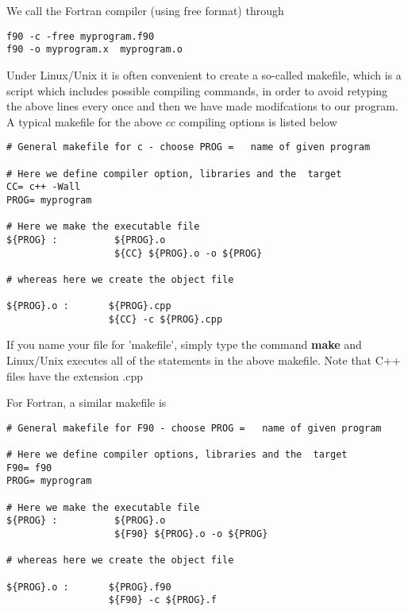 We call the Fortran compiler (using free format) through 
\begin{svgraybox}
\begin{verbatim}
f90 -c -free myprogram.f90
f90 -o myprogram.x  myprogram.o
\end{verbatim}
\end{svgraybox}
Under Linux/Unix it is often convenient to create a
so-called makefile, which is a script which includes possible
compiling commands, in order to avoid retyping the above lines
every once and then we have made modifcations to our program.
A typical makefile for the above $cc$ compiling options is listed
below
\begin{svgraybox}
\begin{verbatim}
# General makefile for c - choose PROG =   name of given program

# Here we define compiler option, libraries and the  target
CC= c++ -Wall
PROG= myprogram

# Here we make the executable file 
${PROG} :          ${PROG}.o
                   ${CC} ${PROG}.o -o ${PROG}

# whereas here we create the object file

${PROG}.o :       ${PROG}.cpp
                  ${CC} -c ${PROG}.cpp

\end{verbatim}   
\end{svgraybox}                                            
If you name your file for 'makefile', simply type the command
{\bf make} and Linux/Unix executes all of the statements in the above
makefile. Note that C++ files have the extension .cpp

For Fortran, a similar makefile is
\begin{svgraybox}
\begin{verbatim}
# General makefile for F90 - choose PROG =   name of given program

# Here we define compiler options, libraries and the  target
F90= f90 
PROG= myprogram

# Here we make the executable file 
${PROG} :          ${PROG}.o
                   ${F90} ${PROG}.o -o ${PROG}

# whereas here we create the object file

${PROG}.o :       ${PROG}.f90
                  ${F90} -c ${PROG}.f
\end{verbatim}                                               
\end{svgraybox}

